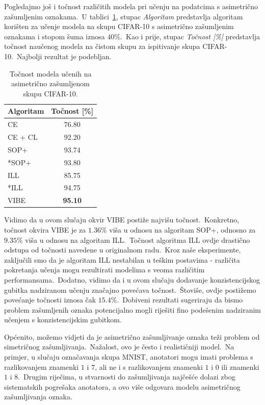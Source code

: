 \documentclass[diplomskirad]{fer}
\begin{document}
Pogledajmo još i točnost različitih modela pri učenju na podatcima s asimetrično zašumljenim oznakama.\ 
U tablici~\ref{tbl:usporedba_asimetricne}, stupac \textit{Algoritam} predstavlja algoritam korišten za učenje modela na skupu CIFAR-10 s asimetrično zašumljenim oznakama i stopom šuma iznosa $40\%$.\ 
Kao i prije, stupac \textit{Točnost [\%]} predstavlja točnost naučenog modela na čistom skupu za ispitivanje skupa CIFAR-10.\ Najbolji rezultat je podebljan.\ 

\pagebreak

\begin{table}[htb]
  \caption{Točnost modela učenih na asimetrično zašumljenom skupu CIFAR-10.}
  \label{tbl:usporedba_asimetricne}
  \centering
  \begin{tabular}{l||c}
  Algoritam & Točnost [\%] \\ \hline \hline
  CE & 76.80 \\
  CE + CL & 92.20 \\ \hline
  SOP+ & 93.74 \\
  *SOP+ & 93.80 \\
  ILL & 85.75 \\ 
  *ILL & 94.75 \\ \hline
  VIBE & \textbf{95.10} \\
  \end{tabular}
\end{table}

Vidimo da u ovom slučaju okvir VIBE postiže najvišu točnost.\ Konkretno, točnost okvira VIBE je za $1.36\%$ viša u odnosu na algoritam SOP+, odnosno za $9.35\%$ viša u odnosu na algoritam ILL.\ 
Točnost algoritma ILL ovdje drastično odstupa od točnosti navedene u originalnom radu.\ Kroz naše eksperimente, zaključili smo da je algoritam ILL nestabilan u teškim postavima - različita pokretanja učenja mogu rezultirati modelima s veoma različitim performansama.\ 
Dodatno, vidimo da i u ovom slučaju dodavanje konzistencijskog gubitka nadziranom učenju značajno povećava točnost.\ Štoviše, ovdje postižemo povećanje točnosti iznosa čak $15.4\%$.\ 
Dobiveni rezultati sugeriraju da bismo problem zašumljenih oznaka potencijalno mogli riješiti fino podešenim nadziranim učenjem s konzistencijskim gubitkom.\ 

Općenito, možemo vidjeti da je asimetrično zašumljivanje oznaka teži problem od simetričnog zašumljivanja.\ 
Nažalost, ovo je često i realističniji model.\ Na primjer, u slučaju označavanja skupa MNIST, anotatori mogu imati problema s razlikovanjem znamenki $1$ i $7$, ali ne i s razlikovanjem znamenki $1$ i $0$ ili znamenki $1$ i $8$.\ 
Drugim riječima, u stvarnosti do zašumljivanja najčešće dolazi zbog sistematskih pogrešaka anotatora, a ovo više odgovara modelu asimetričnog zašumljivanja oznaka.\ 
\end{document}
